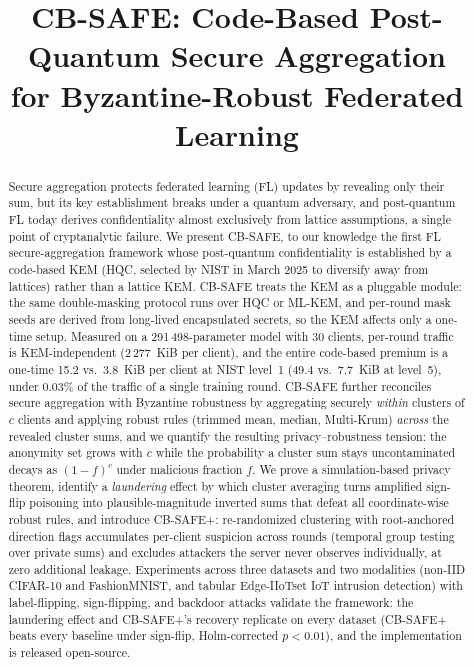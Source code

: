 \documentclass[conference]{IEEEtran}
\begin{document}
\title{CB-SAFE: Code-Based Post-Quantum Secure Aggregation\\ for Byzantine-Robust Federated Learning}

\author{
}

\maketitle

\begin{abstract}
Secure aggregation protects federated learning (FL) updates by revealing only their
sum, but its key establishment breaks under a quantum adversary, and post-quantum FL
today derives confidentiality almost exclusively from lattice assumptions, a single
point of cryptanalytic failure. We present CB-SAFE, to our knowledge the first FL
secure-aggregation framework whose post-quantum confidentiality is established by a
code-based KEM (HQC, selected by NIST in March 2025 to diversify away from lattices)
rather than a lattice KEM. CB-SAFE treats the KEM as a pluggable module: the same
double-masking protocol runs over HQC or ML-KEM, and per-round mask seeds are derived
from long-lived encapsulated secrets, so the KEM affects only a one-time setup.
Measured on a 291\,498-parameter model with 30 clients, per-round traffic is
KEM-independent (2\,277~KiB per client), and the entire code-based premium is a
one-time 15.2 vs.\ 3.8~KiB per client at NIST level~1 (49.4 vs.\ 7.7~KiB at level~5),
under 0.03\% of the traffic of a single training round. CB-SAFE further reconciles
secure aggregation with Byzantine robustness by aggregating securely \emph{within}
clusters of $c$ clients and applying robust rules (trimmed mean, median, Multi-Krum)
\emph{across} the revealed cluster sums, and we quantify the resulting
privacy--robustness tension: the anonymity set grows with $c$ while the probability a
cluster sum stays uncontaminated decays as $(1-f)^{c}$ under malicious fraction $f$.
We prove a simulation-based privacy theorem, identify a \emph{laundering} effect by
which cluster averaging turns amplified sign-flip poisoning into plausible-magnitude
inverted sums that defeat all coordinate-wise robust rules, and introduce CB-SAFE+:
re-randomized clustering with root-anchored direction flags accumulates per-client
suspicion across rounds (temporal group testing over private sums) and excludes
attackers the server never observes individually, at zero additional leakage.
Experiments across three datasets and two modalities (non-IID CIFAR-10 and
FashionMNIST, and tabular Edge-IIoTset IoT intrusion detection) with
label-flipping, sign-flipping, and backdoor attacks validate the framework: the
laundering effect and CB-SAFE+'s recovery replicate on every dataset (CB-SAFE+
beats every baseline under sign-flip, Holm-corrected $p{<}0.01$), and the
implementation is released open-source.
\end{abstract}
\end{document}
